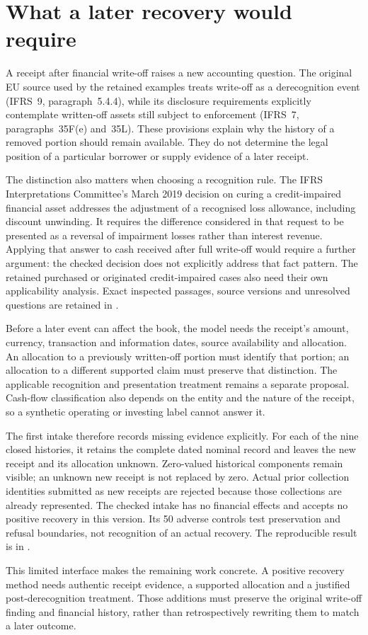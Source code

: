 \section{What a later recovery would require}
\label{sim:credit-recovery-scope}

A receipt after financial write-off raises a new accounting question. The
original EU source used by the retained examples treats write-off as a
derecognition event (IFRS~9, paragraph~5.4.4), while its disclosure requirements
explicitly contemplate written-off assets still subject to enforcement
(IFRS~7, paragraphs~35F(e) and~35L). These provisions explain why the history
of a removed portion should remain available. They do not determine the legal
position of a particular borrower or supply evidence of a later receipt.

The distinction also matters when choosing a recognition rule. The IFRS
Interpretations Committee's March 2019 decision on curing a credit-impaired
financial asset addresses the adjustment of a recognised loss allowance,
including discount unwinding. It requires the difference considered in that
request to be presented as a reversal of impairment losses rather than interest
revenue. Applying that answer to cash received after full write-off would
require a further argument: the checked decision does not explicitly address
that fact pattern. The retained purchased or originated credit-impaired cases
also need their own applicability analysis. Exact inspected passages, source
versions and unresolved questions are retained in
.

Before a later event can affect the book, the model needs the receipt's amount,
currency, transaction and information dates, source availability and allocation.
An allocation to a previously written-off portion must identify that portion;
an allocation to a different supported claim must preserve that distinction.
The applicable recognition and presentation treatment remains a separate
proposal. Cash-flow classification also depends on the entity and the nature
of the receipt, so a synthetic operating or investing label cannot answer it.

The first intake therefore records missing evidence explicitly. For each of
the nine closed histories, it retains the complete dated nominal record and
leaves the new receipt and its allocation unknown. Zero-valued historical
components remain visible; an unknown new receipt is not replaced by zero.
Actual prior collection identities submitted as new receipts are rejected
because those collections are already represented. The checked intake has no
financial effects and accepts no positive recovery in this version. Its 50
adverse controls test preservation and refusal boundaries, not recognition of
an actual recovery. The reproducible result is in
.

This limited interface makes the remaining work concrete. A positive recovery
method needs authentic receipt evidence, a supported allocation and a justified
post-derecognition treatment. Those additions must preserve the original
write-off finding and financial history, rather than retrospectively rewriting
them to match a later outcome.
